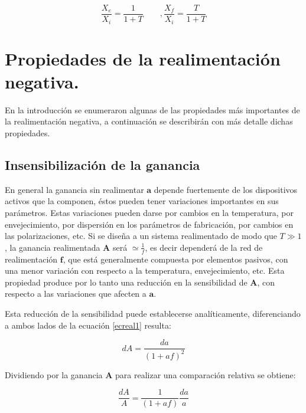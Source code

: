 	\begin{equation}
		\frac {\displaystyle X_e}{\displaystyle X_i}=\frac{ \displaystyle 1}{\displaystyle
			1+T} \qquad , \frac {\displaystyle X_f}{\displaystyle X_i}=\frac{
			\displaystyle T}{\displaystyle 1+T}
	\end{equation}

\section{Propiedades de la realimentación negativa.}

\hspace{10pt}  En la introducción se enumeraron algunas de las propiedades más
importantes de la realimentación negativa, a continuación se
describirán con más detalle dichas propiedades.

\subsection{Insensibilización de la ganancia}

\hspace{10pt}  En general la ganancia sin realimentar $\textbf{a}$ depende
fuertemente de los dispositivos activos que la componen, éstos
pueden tener variaciones importantes en sus parámetros. Estas
variaciones pueden darse por cambios en la temperatura, por
envejecimiento, por dispersión en los parámetros de fabricación, por
cambios en las polarizaciones, etc. Si se diseña a un sistema
realimentado de modo que $T\gg 1$, la ganancia realimentada
$\textbf{A}$ será $\simeq \frac{\displaystyle 1}{\displaystyle f}$,
es decir dependerá de la red de realimentación $\textbf{f}$, que
está generalmente compuesta por elementos pasivos, con una menor
variación con respecto a la temperatura, envejecimiento, etc. Esta
propiedad produce por lo tanto una reducción en la sensibilidad de
$\textbf{A}$, con respecto a las variaciones que afecten a
$\textbf{a}$.

Esta reducción de la sensibilidad puede establecerse
analíticamente, diferenciando a ambos lados de la ecuación
\ref{ecreal1} resulta:

	\begin{equation}
		dA=\frac {\displaystyle da}{\displaystyle (1+af)^2}
	\end{equation}


Dividiendo por la ganancia $\textbf{A}$ para realizar una
comparación relativa se obtiene:

	\begin{equation}
		\frac{\displaystyle dA}{\displaystyle A}=\frac {\displaystyle 1}{\displaystyle (1+af)}\frac{\displaystyle da}{\displaystyle a}
	\end{equation}

